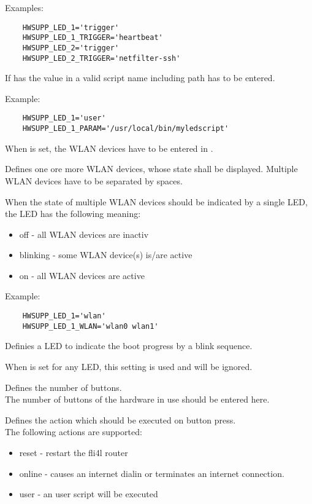 \begin{description}
  Examples:
  \begin{verbatim}
    HWSUPP_LED_1='trigger'
    HWSUPP_LED_1_TRIGGER='heartbeat'
    HWSUPP_LED_2='trigger'
    HWSUPP_LED_2_TRIGGER='netfilter-ssh'
  \end{verbatim}

  If  has the value  
  in  a valid script name including path has to be entered. 

  Example:
  \begin{verbatim}
    HWSUPP_LED_1='user'
    HWSUPP_LED_1_PARAM='/usr/local/bin/myledscript'
  \end{verbatim}

  When  is set, the WLAN devices have to be entered in 
  .
  
  Defines one ore more WLAN devices, whose state shall be displayed.
  Multiple WLAN devices have to be separated by spaces.

  When the state of multiple WLAN devices should be indicated by a single LED, 
  the LED has the following meaning:
  \begin{itemize}
    \item off - all WLAN devices are inactiv
    \item blinking - some WLAN device(s) is/are active
    \item on - all WLAN devices are active
  \end{itemize} 

  Example:
  \begin{verbatim}
    HWSUPP_LED_1='wlan'
    HWSUPP_LED_1_WLAN='wlan0 wlan1'
  \end{verbatim}


  Definies a LED to indicate the boot progress by a blink sequence. 
  
  When  is set for any LED, this setting is used
  and  will be ignored.

  Defines the number of buttons.\\ The number of buttons of the hardware in use 
  should be entered here.

  Defines the action which should be executed on button press.\\
  The following actions are supported:
  \begin{itemize}
    \item reset - restart the fli4l router
    \item online - causes an internet dialin or terminates an internet connection.
    \item user - an user script will be executed
  \end{itemize}


\end{description}
